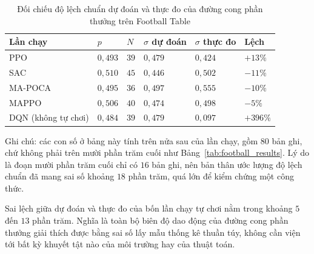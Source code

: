 \begin{table}[H]
\centering
\caption{Đối chiếu độ lệch chuẩn dự đoán và thực đo của đường cong phần thưởng trên
Football Table}
\label{tab:football_variance}
\renewcommand{\arraystretch}{1.35}
\tablefont
\setlength{\tabcolsep}{4pt}
\begin{tabular}{|p{4.3cm}|>{\centering\arraybackslash}p{1.5cm}
                |>{\centering\arraybackslash}p{1.3cm}
                |>{\centering\arraybackslash}p{2.05cm}
                |>{\centering\arraybackslash}p{2.05cm}
                |>{\centering\arraybackslash}p{1.5cm}|}
\hline
\textbf{Lần chạy} & \textbf{$p$} & \textbf{$N$} & \textbf{$\sigma$ dự đoán} & \textbf{$\sigma$ thực đo} & \textbf{Lệch} \\
\hline
PPO & $0{,}493$ & $39$ & $0{,}479$ & $0{,}424$ & $+13\%$ \\
\hline
SAC & $0{,}510$ & $45$ & $0{,}446$ & $0{,}502$ & $-11\%$ \\
\hline
MA-POCA & $0{,}495$ & $36$ & $0{,}497$ & $0{,}555$ & $-10\%$ \\
\hline
MAPPO & $0{,}506$ & $40$ & $0{,}474$ & $0{,}498$ & $-5\%$ \\
\hline
DQN (không tự chơi) & $0{,}484$ & $39$ & $0{,}479$ & $0{,}097$ & $+396\%$ \\
\hline
\end{tabular}

\vspace{0.15cm}
{\footnotesize Ghi chú: các con số ở bảng này tính trên nửa sau của lần chạy, gồm $80$ bản
ghi, chứ không phải trên mười phần trăm cuối như Bảng~\ref{tab:football_results}. Lý do là
đoạn mười phần trăm cuối chỉ có $16$ bản ghi, nên bản thân ước lượng độ lệch chuẩn đã mang
sai số khoảng $18$ phần trăm, quá lớn để kiểm chứng một công thức.}
\end{table}

\indent Sai lệch giữa dự đoán và thực đo của bốn lần chạy tự chơi nằm trong khoảng $5$ đến
$13$ phần trăm. Nghĩa là toàn bộ biên độ dao động của đường cong phần thưởng giải thích được
bằng sai số lấy mẫu thống kê thuần túy, không cần viện tới bất kỳ khuyết tật nào của môi
trường hay của thuật toán.

